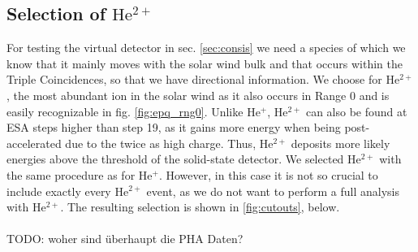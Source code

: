 \subsection{Selection of $\mathrm{He^{2+}}$}
For testing the virtual detector in sec. \ref{sec:consis} we need a species of which we know that it mainly moves with the solar wind bulk and that occurs within the Triple Coincidences, so that we have directional information. We choose for $\mathrm{He^{2+}}$, the most abundant ion in the solar wind \citep[][,ch. 6.1]{prlss_2004} as it also occurs in Range 0 and is easily recognizable in fig. \ref{fig:epq_rng0}.
Unlike $\mathrm{He^{+}}$, $\mathrm{He^{2+}}$ can also be found at ESA steps higher than step 19, as it gains more energy when being post-accelerated due to the twice as high charge. Thus, $\mathrm{He^{2+}}$ deposits more likely energies above the threshold of the solid-state detector. 
We selected $\mathrm{He^{2+}}$ with the same procedure as for $\mathrm{He^{+}}$. However, in this case it is not so crucial to include exactly every $\mathrm{He^{2+}}$ event, as we do not want to perform a full analysis with $\mathrm{He^{2+}}$. The resulting selection is shown in \ref{fig:cutouts}, below.
\\ \\
TODO: woher sind überhaupt die PHA Daten?\\
%
%
%

